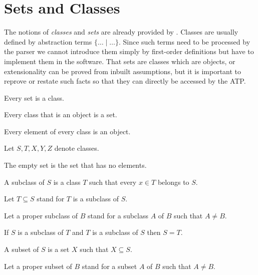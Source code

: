 \documentclass[11pt]{article}
\begin{document}
\section{Sets and Classes}
The notions of \textit{classes} and \textit{sets} are already
provided by \Naproche. Classes are usually defined by
abstraction terms $\{\dots\mid\dots\}$. Since such terms need to be
processed by the parser we cannot introduce them simply by first-order
definitions but have to implement them in the software.
That sets are classes which are objects, or extensionality can be proved
from inbuilt assumptions, but it is important to reprove or restate such
facts so that they can directly be accessed by the ATP.

\begin{forthel}


\begin{lemma} Every set is a class. \end{lemma}

\begin{lemma} Every class that is an object is a set. \end{lemma}

\begin{axiom} Every element of every class is an object.
\end{axiom}

Let $S,T,X,Y,Z$ denote classes.

\begin{definition} The empty set is the set that has
no elements.
\end{definition}

\begin{definition}
A subclass of $S$ is a class $T$ such that every $x \in T$
belongs to $S$.
\end{definition}

Let $T \subseteq S$ stand for $T$ is a subclass of $S$.

Let a proper subclass of $B$ stand for a subclass $A$ of $B$ such that $A\neq B$.

\begin{lemma}  If $S$ is a subclass of $T$ and
$T$ is a subclass of $S$ then $S = T$.
\end{lemma}

\begin{definition}
A subset of $S$ is a set $X$ such that $X \subseteq S$.
\end{definition}

Let a proper subset of $B$ stand for a subset $A$ of $B$ such that $A\neq B$.



\end{forthel}
\end{document}
